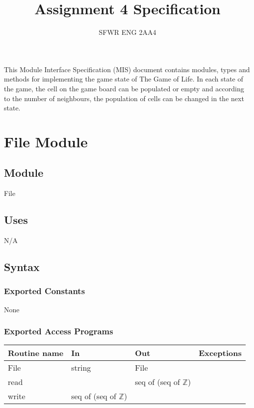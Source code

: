 \documentclass[12pt]{article}
\title{Assignment 4 Specification}
\author{SFWR ENG 2AA4}
\begin{document}
\maketitle

\noindent This Module Interface Specification (MIS) document contains modules, types and methods for implementing the game state of
The Game of Life. In each state of the game, the cell on the game board can be populated or empty and according to the number of neighbours, the population of cells can be changed in the next state.
\begin{center}

\end{center}

\newpage

\section* {File Module}

\subsection*{Module}

File

\subsection* {Uses}

N/A

\subsection* {Syntax}

\subsubsection* {Exported Constants}

None


\subsubsection* {Exported Access Programs}

\begin{tabular}{| l | l | l | l |}
\hline
\textbf{Routine name} & \textbf{In} & \textbf{Out} & \textbf{Exceptions}\\
\hline
File & string & File & ~\\
\hline
read & ~ & seq of (seq of $\mathbb{Z}$) & ~\\
\hline
write & seq of (seq of $\mathbb{Z}$) & ~ & ~\\

\hline
\end{tabular}
\end{document}
